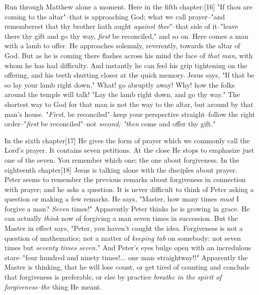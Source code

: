 Run through Matthew alone a moment. Here in the fifth chapter:[16] "If
thou are coming to the altar"--that is approaching God; what we call
prayer--"and rememberest that thy brother hath aught \textit{against thee}"--that
side of it--"leave there thy gift and go thy way, \textit{first} be reconciled,"
and so on. Here comes a man with a lamb to offer. He approaches solemnly,
reverently, towards the altar of God. But as he is coming there flashes
across his mind the face of \textit{that man}, with whom he has had difficulty.
And instantly he can feel his grip tightening on the offering, and his
teeth shutting closer at the quick memory. Jesus says, "If that be so lay
your lamb right down." What! go abruptly away! Why! how the folks around
the temple will talk! "Lay the lamb right down, and go thy way." The
shortest way to God for that man is not the way to the altar, but around
by that man's house. "\textit{First}, be reconciled"--keep your perspective
straight--follow the right order--"\textit{first} be reconciled"--not \textit{second;
"then} come and offer thy gift."

In the sixth chapter[17] He gives the form of prayer which we commonly
call the Lord's prayer. It contains seven petitions. At the close He
stops to emphasize just one of the seven. You remember which one; the one
about forgiveness. In the eighteenth chapter[18] Jesus is talking alone
with the disciples about prayer. Peter seems to remember the previous
remarks about forgiveness in connection with prayer; and he asks a
question. It is never difficult to think of Peter asking a question or
making a few remarks. He says, "Master, how many times \textit{must} I forgive a
man? \textit{Seven} times!" Apparently Peter thinks he is growing in grace. He
can actually \textit{think} now of forgiving a man seven times in succession. But
the Master in effect says, "Peter, you haven't caught the idea.
Forgiveness is not a question of mathematics; not a matter of \textit{keeping
tab} on somebody: not seven times but \textit{seventy times seven.}" And Peter's
eyes bulge open with an incredulous stare--"four hundred and ninety
times!... one man--straightway!!" Apparently the Master is thinking, that
he will lose count, or get tired of counting and conclude that forgiveness
is preferable, or else by practice \textit{breathe in the spirit of
forgiveness--the} thing He meant.

